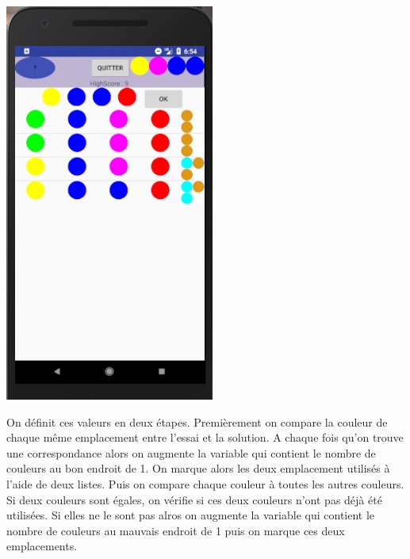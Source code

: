 \documentclass{article}
\begin{document}
\begin{center}
\includegraphics[scale = 0.5]{Ingame}
\end{center}
On d\'{e}finit ces valeurs en deux \'{e}tapes. Premi\`{e}rement on compare la couleur de chaque m\^{e}me emplacement entre l'essai et la solution. A chaque fois qu'on trouve une correspondance alors on augmente la variable qui contient le nombre de couleurs au bon endroit de 1. On marque alors les deux emplacement utilis\'{e}s \`{a} l'aide de deux listes. Puis on compare chaque couleur \`{a} toutes les autres couleurs. Si deux couleurs sont \'{e}gales, on v\'{e}rifie si ces deux couleurs n'ont pas d\'{e}j\`{a} \'{e}t\'{e} utilis\'{e}es. Si elles ne le sont pas alros on augmente la variable qui contient le nombre de couleurs au mauvais endroit de 1 puis on marque ces deux emplacements.
\end{document}
